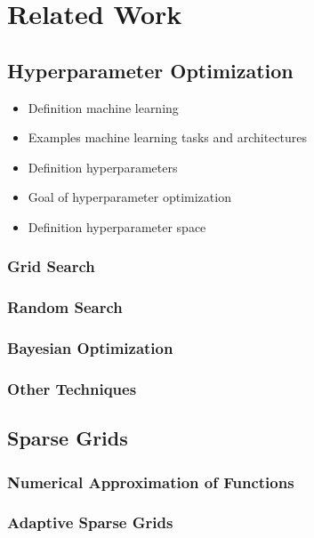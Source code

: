 
\chapter{Related Work}\label{chapter:theoretical_background}

\section{Hyperparameter Optimization}

\begin{itemize}
	\item Definition machine learning 
	\item Examples machine learning tasks and architectures
	\item Definition hyperparameters
	\item Goal of hyperparameter optimization
	\item Definition hyperparameter space 
\end{itemize}

\subsection{Grid Search}

\subsection{Random Search}

\subsection{Bayesian Optimization}

\subsection{Other Techniques}


\section{Sparse Grids}

\subsection{Numerical Approximation of Functions}

\subsection{Adaptive Sparse Grids}
